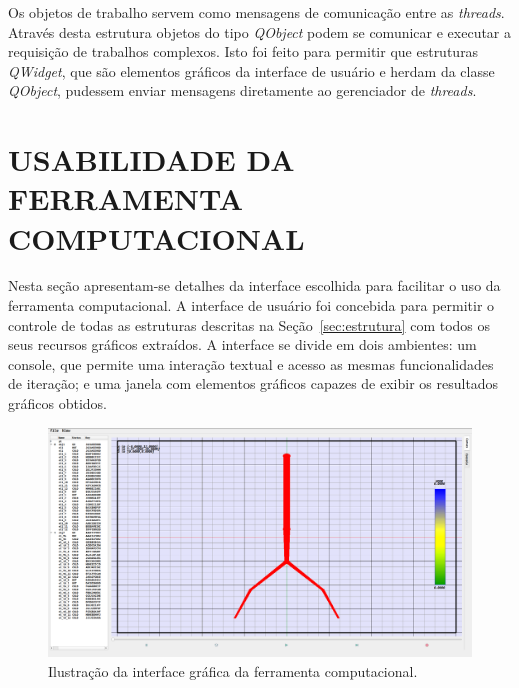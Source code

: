 Os objetos de trabalho servem como mensagens de comunicação entre as \textit{threads}. Através desta estrutura objetos do tipo \textit{QObject} podem se comunicar e executar a requisição de trabalhos complexos. Isto foi feito para permitir que estruturas \textit{QWidget}, que são elementos gráficos da interface de usuário e herdam da classe \textit{QObject}, pudessem enviar mensagens diretamente ao gerenciador de \textit{threads}. 

\chapter{USABILIDADE DA FERRAMENTA COMPUTACIONAL}\label{sec:userinterface}

Nesta seção apresentam-se detalhes da interface escolhida para facilitar o uso da ferramenta computacional. A interface de usuário foi concebida para permitir o controle de todas as estruturas descritas na Seção~\ref{sec:estrutura} com todos os seus recursos gráficos extraídos. A interface se divide em dois ambientes: um console, que permite uma interação textual e acesso as mesmas funcionalidades de iteração; e uma janela com elementos gráficos capazes de exibir os resultados gráficos obtidos. 

\begin{figure}[!htbp]
	\centering
	\includegraphics[width=\linewidth]{Figures/IGU_002.png}
	\caption{Ilustração da interface gráfica da ferramenta computacional.}
	\label{fig10:UI}
\end{figure}

